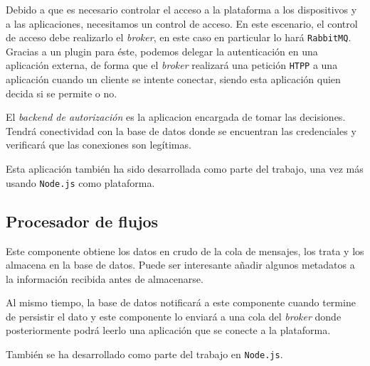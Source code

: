 Debido a que es necesario controlar el acceso a la plataforma a los dispositivos
y a las aplicaciones, necesitamos un control de acceso. En este escenario, el control
de acceso debe realizarlo el \emph{broker}, en este caso en particular lo hará
\texttt{RabbitMQ}. Gracias a un plugin para éste, podemos delegar la autenticación
en una aplicación externa, de forma que el \emph{broker} realizará una petición
\texttt{HTPP} a una aplicación cuando un cliente se intente conectar, siendo esta
aplicación quien decida si se permite o no.

El \emph{backend de autorización} es la aplicacion encargada de tomar las decisiones.
Tendrá conectividad con la base de datos donde se encuentran las credenciales y
verificará que las conexiones son legítimas.

Esta aplicación también ha sido desarrollada como parte del trabajo, una vez más
usando \texttt{Node.js} como plataforma.

\subsection{Procesador de flujos}

Este componente obtiene los datos en crudo de la cola de
mensajes, los trata y los almacena en la base de datos. Puede ser interesante
añadir algunos metadatos a la información recibida antes de almacenarse.

Al mismo tiempo, la base de datos notificará a este componente cuando termine de
persistir el dato y este componente lo enviará a una cola del \emph{broker} donde
posteriormente podrá leerlo una aplicación que se conecte a la plataforma.

También se ha desarrollado como parte del trabajo en \texttt{Node.js}.
